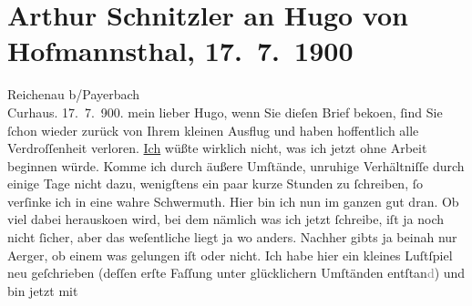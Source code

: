                \section[Arthur Schnitzler an Hugo von Hofmannsthal, 17. 7. 1900]{ Arthur Schnitzler an Hugo von Hofmannsthal, 17. 7. 1900}\nopagebreak{}\rehead{ }\begin{ledgroupsized}[t]{13cm}\normalsize\beginnumbering \toendnotes[C]{\smallbreak\pagebreak[2]} 
\toendnotes[C]{\smallbreak}\pstart
           \raggedleft{}{\pb}Reichenau b/Payerbach{\\}Curhaus.
                     17. 7. 900. \pend
           \pstart
           mein lieber Hugo, wenn Sie dieſen Brief beko{\geminationm}en, ſind Sie ſchon wieder zurück von Ihrem kleinen
               Ausflug und haben hoffentlich \introOben{}alle\introOben{} Verdroſſenheit verloren.
                  \uline{Ich} wüßte wirklich nicht, was ich jetzt ohne
               Arbeit beginnen würde. Komme ich durch äußere Umſtände, unruhige Verhältniſſe durch
               einige Tage nicht dazu, wenigſtens ein paar kurze Stunden zu ſchreiben, ſo verſinke
               ich in eine wahre Schwermuth. Hier bin ich nun im ganzen {\pb}gut dran. Ob viel dabei herausko{\geminationm}en wird, bei dem
               nämlich was ich jetzt ſchreibe, iſt ja noch nicht ſicher, aber das weſentliche liegt
               ja wo anders. Nachher gibts ja beinah nur Aerger, ob einem was gelungen iſt oder
               nicht. Ich habe hier ein kleines Luſtſpiel neu geſchrieben (deſſen erſte Faſſung \label{K_L01057-1v}\label{K_L01057-1h} unter glücklichern Umſtänden entſtan\textcolor{gray}{d}) und bin jetzt mit

\end{ledgroupsized}
